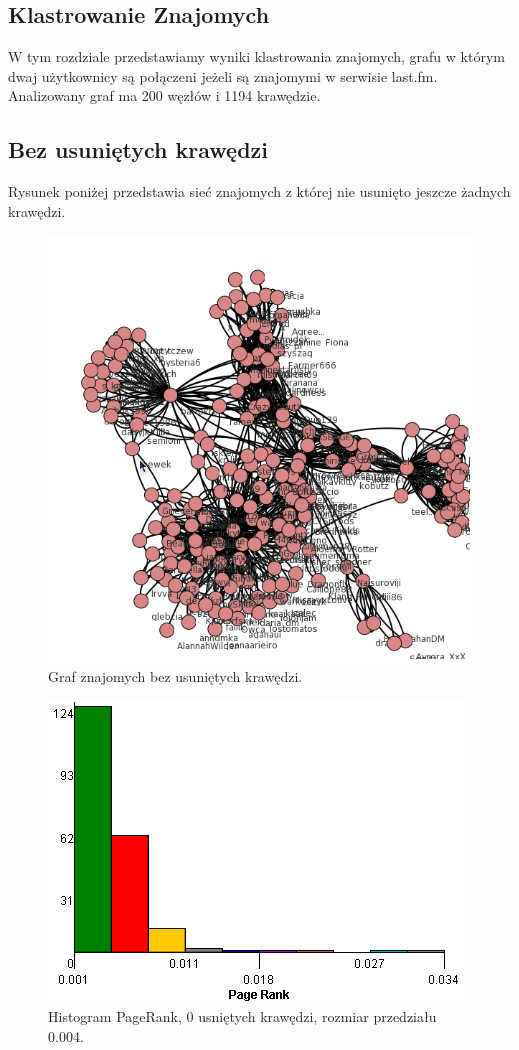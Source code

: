 \documentclass[10pt,a4paper,epic,carom]{article}
\begin{document}
\subsection{Klastrowanie Znajomych}

	W tym rozdziale przedstawiamy wyniki klastrowania znajomych, grafu w którym dwaj użytkownicy są połączeni jeżeli są znajomymi w serwisie last.fm. Analizowany graf ma 200 węzłów i 1194 krawędzie.

\subsection{Bez usuniętych krawędzi}
	Rysunek poniżej przedstawia sieć znajomych z której nie usunięto jeszcze żadnych krawędzi.

\begin{figure}[H]
\centering
\caption{Graf znajomych bez usuniętych krawędzi.}
\includegraphics[scale=0.6]{rys3.png}
\end{figure}

\begin{figure}[H]
\centering
\caption{Histogram PageRank, 0 usniętych krawędzi, rozmiar przedziału 0.004.}
\includegraphics[scale=0.6]{200friendsPR0.png}
\end{figure}
\end{document}
